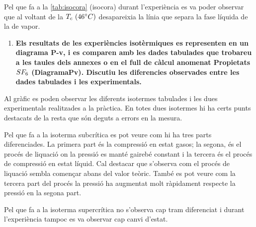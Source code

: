 \documentclass[a4paper]{article}
\begin{document}
Pel que fa a la \autoref{tab:isocora} (isocora) durant l'experiència es va poder observar que al voltant de la $T_c\ (46 \degree C)$ desapareixia la línia que separa la fase líquida de la de vapor.

\begin{enumerate}[resume]
	\item \textbf{Els resultats de les experiències isotèrmiques es representen en un diagrama P-v, i es comparen amb les dades tabulades que trobareu a les taules dels annexes o en el full de càlcul anomenat \textbf{Propietats $\boldmath SF_6$ (DiagramaPv)}. Discutiu les diferencies observades entre les dades tabulades i les experimentals.}
\end{enumerate}

Al gràfic es poden observar les diferents isotermes tabulades i les dues experimentals realitzades a la pràctica. En totes dues isotermes hi ha certs punts destacats de la resta que són deguts a errors en la mesura.

Pel que fa a la isoterma subcrítica es pot veure com hi ha tres parts diferenciades. La primera part és la compressió en estat gasos; la segona, és el procés de liquació on la pressió es manté gairebé constant i la tercera és el procés de compressió en estat líquid. Cal destacar que s'observa com el procés de liquació sembla començar abans del valor teòric. També es pot veure com la tercera part del procés la pressió ha augmentat molt ràpidament respecte la pressió en la segona part.

Pel que fa a la isoterma supercrítica no s'observa cap tram diferenciat i durant l'experiència tampoc es va observar cap canvi d'estat. 
\end{document}
